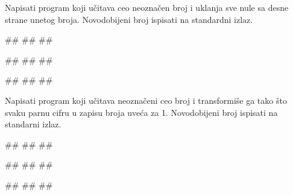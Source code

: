 \begin{Exercise}[label=p1.3_05] 
 Napisati program koji učitava ceo neoznačen broj i uklanja sve nule
 sa desne strane unetog broja. Novodobijeni broj ispisati na
 standardni izlaz. 
 
\begin{miditest}
\begin{upotreba}{1}
#\naslovInt#
##
##
\end{upotreba}
\end{miditest}
\begin{miditest}
\begin{upotreba}{2}
#\naslovInt#
##
##
\end{upotreba}
\end{miditest}

\begin{miditest}
\begin{upotreba}{3}
#\naslovInt#
##
##
\end{upotreba}
\end{miditest}
\end{Exercise}
\begin{Answer}[ref=p1.3_05]
\end{Answer}


\begin{Exercise}[label=p1.3_06] 
Napisati program koji učitava neoznačeni ceo broj i transformiše ga
tako što svaku parnu cifru u zapisu broja uveća za 1. Novodobijeni
broj ispisati na standarni izlaz.

\begin{miditest}
\begin{upotreba}{1}
#\naslovInt#
##
##
\end{upotreba}
\end{miditest}
\begin{miditest}
\begin{upotreba}{2}
#\naslovInt#
##
##
\end{upotreba}
\end{miditest}

\begin{miditest}
\begin{upotreba}{3}
#\naslovInt#
##
##
\end{upotreba}
\end{miditest}
\end{Exercise}
\begin{Answer}[ref=p1.3_06]
\end{Answer}


